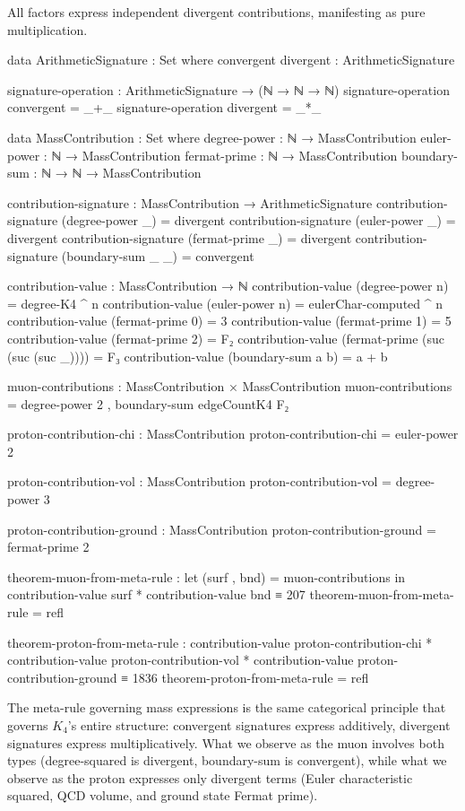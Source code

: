 \documentclass[11pt,a4paper]{book}
\begin{document}
All factors express independent divergent contributions, manifesting as pure multiplication.

\begin{code}
data ArithmeticSignature : Set where
  convergent divergent : ArithmeticSignature

signature-operation : ArithmeticSignature → (ℕ → ℕ → ℕ)
signature-operation convergent = _+_
signature-operation divergent = _*_

data MassContribution : Set where
  degree-power : ℕ → MassContribution
  euler-power  : ℕ → MassContribution
  fermat-prime : ℕ → MassContribution
  boundary-sum : ℕ → ℕ → MassContribution

contribution-signature : MassContribution → ArithmeticSignature
contribution-signature (degree-power _) = divergent
contribution-signature (euler-power _)  = divergent
contribution-signature (fermat-prime _) = divergent
contribution-signature (boundary-sum _ _) = convergent

contribution-value : MassContribution → ℕ
contribution-value (degree-power n) = degree-K4 ^ n
contribution-value (euler-power n)  = eulerChar-computed ^ n
contribution-value (fermat-prime 0) = 3
contribution-value (fermat-prime 1) = 5
contribution-value (fermat-prime 2) = F₂
contribution-value (fermat-prime (suc (suc (suc _)))) = F₃
contribution-value (boundary-sum a b) = a + b

muon-contributions : MassContribution × MassContribution
muon-contributions = degree-power 2 , boundary-sum edgeCountK4 F₂

proton-contribution-chi : MassContribution
proton-contribution-chi = euler-power 2

proton-contribution-vol : MassContribution
proton-contribution-vol = degree-power 3

proton-contribution-ground : MassContribution
proton-contribution-ground = fermat-prime 2

theorem-muon-from-meta-rule : 
  let (surf , bnd) = muon-contributions
  in contribution-value surf * contribution-value bnd ≡ 207
theorem-muon-from-meta-rule = refl

theorem-proton-from-meta-rule :
  contribution-value proton-contribution-chi * 
  contribution-value proton-contribution-vol * 
  contribution-value proton-contribution-ground ≡ 1836
theorem-proton-from-meta-rule = refl
\end{code}

The meta-rule governing mass expressions is the same categorical principle that governs $K_4$'s entire structure: convergent signatures express additively, divergent signatures express multiplicatively. What we observe as the muon involves both types (degree-squared is divergent, boundary-sum is convergent), while what we observe as the proton expresses only divergent terms (Euler characteristic squared, QCD volume, and ground state Fermat prime).
\end{document}
